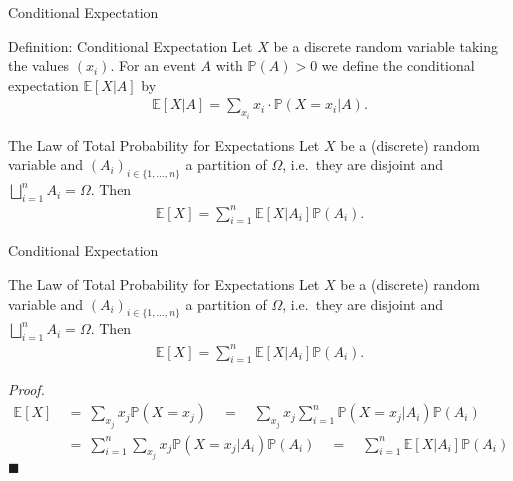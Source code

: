 \documentclass[11pt,pdf,ngerman,UKenglish]{beamer}%
\newcommand{\IP}{\mathbb{P}}
\newcommand{\IE}{{\mathbb{E}}}
\newcommand{\1}{\mathbb{1}}
\renewcommand{\qedsymbol}{$\blacksquare$}
\theoremstyle{thm}
\theoremstyle{def}
\renewenvironment{proof}{\par\noindent\textit{Proof.~}}{\hfill \qedsymbol\newline}
\begin{document}
\begin{frame}{Conditional Expectation}
\begin{block}{Definition: Conditional Expectation}
Let $X$ be a discrete random variable taking the values $(x_i)$. For an event $A$ with $\IP(A) >0$ we define the conditional expectation $\IE[ X \vert A ]$ by
\begin{align*}
\IE[ X \vert A] = \sum_{x_i} x_i \cdot \IP(X= x_i \vert A).
\end{align*}
\end{block}

\begin{block}{The Law of Total Probability for Expectations}
Let $X$ be a (discrete) random variable and $(A_i)_{i \in \{1, \ldots, n\}}$ a partition of $\Omega$, i.e.\ they are disjoint and $\bigsqcup_{i=1}^n A_i = \Omega$. Then
\begin{align*}
\IE[ X ] = \sum_{i=1}^n \IE[ X \vert A_i] \IP(A_i).
\end{align*}
\end{block}
\end{frame}


\begin{frame}{Conditional Expectation}
\begin{block}{The Law of Total Probability for Expectations}
Let $X$ be a (discrete) random variable and $(A_i)_{i \in \{1, \ldots, n\}}$ a partition of $\Omega$, i.e.\ they are disjoint and $\bigsqcup_{i=1}^n A_i = \Omega$. Then
\begin{align*}
\IE[ X ] = \sum_{i=1}^n \IE[ X \vert A_i] \IP(A_i).
\end{align*}
\end{block}
\begin{proof}
\begin{align*}
\IE[X]
\ & = \  \sum_{x_j} x_j \IP(X=x_j)
\quad = \quad \sum_{x_j} x_j \sum_{i=1}^n \IP( X=x_j \vert A_i ) \IP( A_i)
\\ &
= \ \sum_{i=1}^n \sum_{x_j} x_j \IP( X=x_j \vert A_i ) \IP( A_i)
\quad = \quad \sum_{i=1}^n \IE[ X \vert A_i] \IP(A_i)
\end{align*}
\end{proof}
\end{frame}
\end{document}
